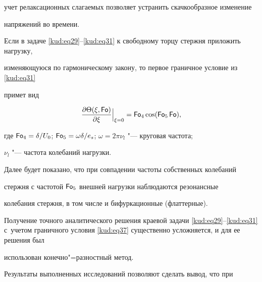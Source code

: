 учет релаксационных слагаемых позволяет устранить скачкообразное изменение

напряжений во времени.







\smallskip




Если в задаче \eqref{kud:eq29}--\eqref{kud:eq31} к свободному торцу стержня приложить нагрузку,

изменяющуюся по гармоническому закону, то первое граничное условие из \eqref{kud:eq31}

примет вид

\begin{equation}

\label{kud:eq37}

\frac{\partial  \Theta(\xi ,\operatorname{\sf Fo})} {\partial  \xi}\Big|_{\xi=0}=\operatorname{\sf Fo}_4 \cos

(\operatorname{\sf Fo}_5 \operatorname{\sf Fo}), \vspace{-2mm}

\end{equation}

где $\operatorname{\sf Fo}_4 = \delta /U_0$; $\operatorname{\sf Fo}_5 = \omega \delta

/e_s$; $ \omega =2 \pi \nu_l $ "--- круговая частота;

$ \nu_l$ "--- частота колебаний нагрузки.



Далее будет показано, что при совпадении частоты собственных колебаний

стержня с частотой $\operatorname{\sf Fo}_5 $ внешней нагрузки наблюдаются резонансные

колебания стержня, в том числе и бифуркационные (флаттерные).



Получение точного аналитического решения краевой задачи \eqref{kud:eq29}--\eqref{kud:eq31} \linebreak с~учетом граничного условия \eqref{kud:eq37} существенно усложняется, и для ее решения был

использован конечно"=разностный метод.



Результаты выполненных исследований позволяют сделать вывод, что при

